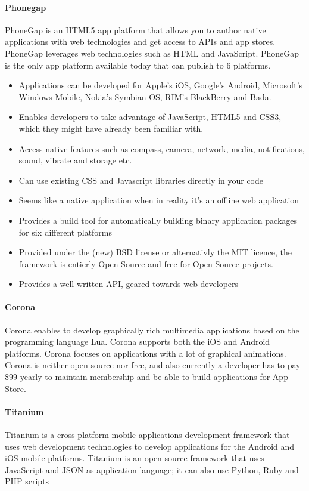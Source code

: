 \paragraph{\bf{Phonegap}}
PhoneGap is an HTML5 app platform that allows you to author native applications with web technologies and get access to APIs and app stores. PhoneGap leverages web technologies such as HTML and JavaScript. PhoneGap is the only app platform available today that can publish to 6 platforms.
\cite{phonegap:about}
	\begin{itemize}
		\item Applications can be developed for Apple’s iOS, Google’s Android,
		Microsoft’s Windows Mobile, Nokia’s Symbian OS, RIM’s BlackBerry and Bada.
		\item Enables developers to take advantage of JavaScript, HTML5 and CSS3,
		which they might have already been familiar with.
		\item Access native features such as compass, camera, network, media,
		notifications, sound, vibrate and storage etc.
    \item Can use existing CSS and Javascript libraries directly in your code
    \item Seems like a native application when in reality it's an offline web application
    \item Provides a build tool for automatically building binary application packages for six different platforms
    \item Provided under the (new) BSD license or alternativly the MIT licence, the framework is entierly Open Source and free for Open Source projects.
    \item Provides a well-written API, geared towards web developers
	\end{itemize}

\paragraph{Corona}
Corona enables to develop graphically rich multimedia applications based on the programming
language Lua\cite{corona:about}. Corona supports both the iOS and Android platforms. Corona focuses on
applications with a lot of graphical animations. Corona is neither open source nor free, and also currently a developer
has to pay \$99 yearly to maintain membership and be able to build applications for App Store.

\paragraph{Titanium}
Titanium is a cross-platform mobile applications development framework that uses web
development technologies to develop applications for the Android and iOS mobile platforms.
Titanium is an open source framework that uses JavaScript and JSON as application language;
it can also use Python, Ruby and PHP scripts\cite{titanium:about}
